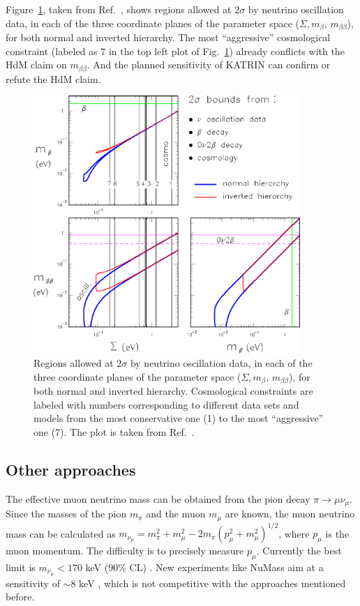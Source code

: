 Figure~\ref{fig:sum1b2b}, taken from Ref.~\cite{Fog07}, shows regions allowed at $2\sigma$ by neutrino oscillation data, in each of the three coordinate planes of the parameter space ($\Sigma, m_{\beta}$, $m_{\beta\beta}$), for both normal and inverted hierarchy. The most ``aggressive'' cosmological constraint (labeled as 7 in the top left plot of Fig.~\ref{fig:sum1b2b}) already conflicts with the HdM claim on $m_{\beta\beta}$. And the planned sensitivity of KATRIN can confirm or refute the HdM claim.
\begin{figure}[tbhp]
\centering
\includegraphics[width=0.9\textwidth]{sum1b2b}  
\caption{Regions allowed at $2\sigma$ by neutrino oscillation data, in
each of the three coordinate planes of the parameter space ($\Sigma,
m_{\beta}$, $m_{\beta\beta}$), for both normal and inverted
hierarchy. Cosmological constraints are labeled with numbers
corresponding to different data sets and models from the most
conservative one (1) to the most ``aggressive'' one (7). The plot is
taken from Ref.~\cite{Fog07}.}
\label{fig:sum1b2b}
\end{figure}

\subsection{Other approaches}
\label{sec:otap}
The effective muon neutrino mass can be obtained from the pion decay $\pi \rightarrow \mu \nu_{\mu}$. Since the masses of the pion $m_{\pi}$ and the muon $m_{\mu}$ are known, the muon neutrino mass can be calculated as $m_{\nu_{\mu}} = m^{2}_{\pi} + m^{2}_{\mu} - 2m_{\pi} (p^{2}_{\mu} + m^{2}_{\mu})^{1/2}$, where $p_{\mu}$ is the muon momentum. The difficulty is to precisely measure $p_{\mu}$. Currently the best limit is $m_{\nu_{\mu}} < 170$ keV (90\% CL) \cite{Ass96}. New experiments like NuMass aim at a sensitivity of $\sim 8$ keV \cite{Num20}, which is not competitive with the approaches mentioned before.

